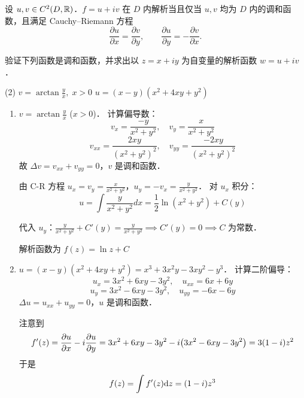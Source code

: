 \documentclass[12pt, a4paper, oneside, UTF8]{ctexbook}
\begin{document}
\begin{theorem}
设 $u,v\in C^2(D,\mathbb{R})$．$f=u+iv$ 在 $D$ 内解析当且仅当 $u,v$ 均为 $D$ 内的调和函数，且满足 Cauchy--Riemann 方程
\[
\frac{\partial u}{\partial x} = \frac{\partial v}{\partial y},\qquad \frac{\partial u}{\partial y} = -\frac{\partial v}{\partial x}.
\]
\end{theorem}

\begin{example}
    验证下列函数是调和函数，并求出以 $z=x+iy$ 为自变量的解析函数 $w=u+iv$．
    \begin{tasks}[label-width=1.2em, label=(\arabic*)](2)
        \task $v=\arctan\frac{y}{x},\;x>0$
        \task $u=(x-y)(x^2+4xy+y^2)$
    \end{tasks}
\end{example}
\begin{solution}
    \begin{enumerate}[label=(\arabic*)]
        \item $v = \arctan\frac{y}{x}$ ($x>0$)．
              计算偏导数：
              \[
              v_x = \frac{-y}{x^2+y^2},\quad v_y = \frac{x}{x^2+y^2}
              \]
              \[
              v_{xx} = \frac{2xy}{(x^2+y^2)^2},\quad v_{yy} = \frac{-2xy}{(x^2+y^2)^2}
              \]
              故 $\Delta v = v_{xx} + v_{yy} = 0$，$v$ 是调和函数．
              
              由 C-R 方程 $u_x = v_y = \frac{x}{x^2+y^2}$，$u_y = -v_x = \frac{y}{x^2+y^2}$．
              对 $u_x$ 积分：
              \[u = \int \frac{y}{x^2+y^2} dx = \frac12\ln(x^2+y^2) + C(y)\]

              代入 $u_y$：$\frac{y}{x^2+y^2} + C'(y) = \frac{y}{x^2+y^2} \implies C'(y)=0 \implies C$ 为常数．

              解析函数为 $f(z) = \ln z + C$
        
        \item $u = (x-y)(x^2+4xy+y^2) = x^3 + 3x^2y - 3xy^2 - y^3$．
              计算二阶偏导：
              \[
              u_x = 3x^2 + 6xy - 3y^2,\quad u_{xx} = 6x + 6y
              \]
              \[
              u_y = 3x^2 - 6xy - 3y^2,\quad u_{yy} = -6x - 6y
              \]
              $\Delta u = u_{xx} + u_{yy} = 0$，$u$ 是调和函数．

              注意到
              \[f'(z)=\pdv{u}{x}-i\pdv{u}{y}=3x^2+6xy-3y^2-i\bigl(3x^2-6xy-3y^2\bigr)=3(1-i)z^2\]
              于是
              \[f(z)=\int f'(z)\mathrm{d} z=(1-i)z^3\]
    \end{enumerate}
\end{solution}

\ifx\allfiles\undefined
\end{document}
